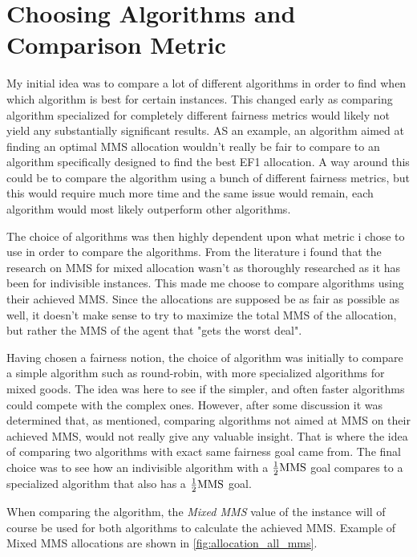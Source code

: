 \section{Choosing Algorithms and Comparison Metric}\label{sec:choosing-algorithms}

My initial idea was to compare a lot of different algorithms in order to find when which algorithm is best for certain instances. This changed early as comparing algorithm specialized for completely different fairness metrics would likely not yield any substantially significant results. AS an example, an algorithm aimed at finding an optimal MMS allocation wouldn't really be fair to compare to an algorithm specifically designed to find the best EF1 allocation. A way around this could be to compare the algorithm using a bunch of different fairness metrics, but this would require much more time and the same issue would remain, each algorithm would most likely outperform other algorithms. 

The choice of algorithms was then highly dependent upon what metric i chose to use in order to compare the algorithms. From the literature i found that the research on MMS for mixed allocation wasn't as thoroughly researched as it has been for indivisible instances. This made me choose to compare algorithms using their achieved MMS. Since the allocations are supposed be as fair as possible as well, it doesn't make sense to try to maximize the total MMS of the allocation, but rather the MMS of the agent that "gets the worst deal".

Having chosen a fairness notion, the choice of algorithm was initially to compare a simple algorithm such as round-robin, with more specialized algorithms for mixed goods. The idea was here to see if the simpler, and often faster algorithms could compete with the complex ones. However, after some discussion it was determined that, as mentioned, comparing algorithms not aimed at MMS on their achieved MMS, would not really give any valuable insight. That is where the idea of comparing two algorithms with exact same fairness goal came from. The final choice was to see how an indivisible algorithm with a $\frac{1}{2}\text{MMS}$ goal compares to a specialized algorithm that also has a $\frac{1}{2}\text{MMS}$ goal. 

When comparing the algorithm, the \textit{Mixed MMS} value of the instance will of course be used for both algorithms to calculate the achieved MMS. Example of Mixed MMS allocations are shown in \autoref{fig:allocation_all_mms}.

